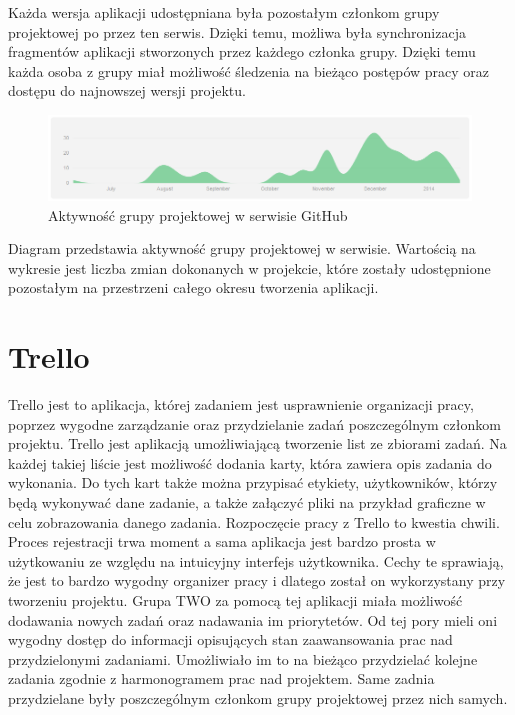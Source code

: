 Każda wersja aplikacji udostępniana była pozostałym członkom grupy projektowej po przez ten serwis. Dzięki temu, możliwa była synchronizacja fragmentów aplikacji stworzonych przez każdego członka grupy. Dzięki temu każda osoba z grupy miał możliwość śledzenia na bieżąco postępów pracy oraz dostępu do najnowszej wersji projektu. 
\begin{figure}[h]
	\centering
	\includegraphics[width=1.00\textwidth]{images/git.png}
	\caption{Aktywność grupy projektowej w serwisie GitHub}
\end{figure}

Diagram przedstawia aktywność grupy projektowej w serwisie. Wartością na wykresie jest liczba zmian dokonanych w projekcie, które zostały udostępnione pozostałym na przestrzeni całego  okresu tworzenia aplikacji. 

\section{Trello}
Trello jest to aplikacja, której zadaniem jest usprawnienie organizacji pracy, poprzez wygodne zarządzanie oraz przydzielanie zadań poszczególnym członkom projektu. Trello jest aplikacją umożliwiającą tworzenie list ze zbiorami zadań. Na każdej takiej liście jest możliwość dodania karty, która zawiera opis zadania do wykonania. Do tych kart także można przypisać etykiety, użytkowników, którzy będą wykonywać dane zadanie, a także załączyć pliki  na przykład graficzne w celu zobrazowania danego zadania. Rozpoczęcie pracy z Trello  to kwestia chwili. Proces rejestracji trwa moment a sama aplikacja jest bardzo prosta w użytkowaniu ze względu na intuicyjny interfejs użytkownika. Cechy te sprawiają, że jest to bardzo wygodny organizer pracy i dlatego został on wykorzystany przy tworzeniu projektu. Grupa TWO za pomocą tej aplikacji miała możliwość dodawania nowych zadań oraz nadawania im priorytetów. Od tej pory mieli oni wygodny dostęp do informacji opisujących stan zaawansowania prac nad przydzielonymi zadaniami. Umożliwiało im to na bieżąco przydzielać kolejne zadania zgodnie z harmonogramem prac nad projektem. Same zadnia przydzielane były poszczególnym członkom grupy projektowej przez nich samych. 

